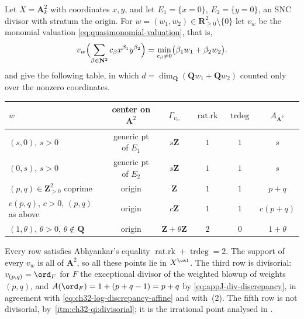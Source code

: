 \begin{example}
\label{ex:ch32-affine-plane}
Let $X=\mathbf A^2_k$ with coordinates $x,y$, and let
$E_1=\{x=0\}$, $E_2=\{y=0\}$, an SNC divisor with stratum the origin.
For $w=(w_1,w_2)\in\mathbf R^2_{\geq0}\setminus\{0\}$ let $v_w$ be the
monomial valuation \eqref{eq:quasimonomial-valuation}, that is,
\[
 v_w\Bigl(\sum_{\beta\in\mathbf N^2}c_\beta x^{\beta_1}y^{\beta_2}\Bigr)
 =\min_{c_\beta\neq0}\bigl(\beta_1w_1+\beta_2w_2\bigr).
\]
 and
 give the following table, in which
$d=\dim_{\mathbf Q}(\mathbf Qw_1+\mathbf Qw_2)$ counted only over the
nonzero coordinates.

\begin{center}
\small
\begin{tabular}{l|c|c|c|c|c}
\toprule
$w$&center on $\mathbf A^2$&$\Gamma_{v_w}$&
 $\operatorname{rat.rk}$&$\operatorname{trdeg}$&$A_{\mathbf A^2}$\\
\midrule
$(s,0)$, $s>0$&generic pt of $E_1$&$s\mathbf Z$&$1$&$1$&$s$\\
$(0,s)$, $s>0$&generic pt of $E_2$&$s\mathbf Z$&$1$&$1$&$s$\\
$(p,q)\in\mathbf Z_{>0}^2$ coprime&origin&$\mathbf Z$&$1$&$1$&$p+q$\\
$c(p,q)$, $c>0$, $(p,q)$ as above&origin&$c\mathbf Z$&$1$&$1$&$c(p+q)$\\
$(1,\theta)$, $\theta>0$, $\theta\notin\mathbf Q$&origin&
 $\mathbf Z+\theta\mathbf Z$&$2$&$0$&$1+\theta$\\
\bottomrule
\end{tabular}
\end{center}

Every row satisfies Abhyankar's equality
$\operatorname{rat.rk}+\operatorname{trdeg}=2$.  The support of every
$v_w$ is all of $\mathbf A^2$, so all these points lie in
$X^{\val}$.  The third row is divisorial: $v_{(p,q)}=\ord_F$ for $F$
the exceptional divisor of the weighted blowup of weights $(p,q)$, and
$A(\ord_F)=1+(p+q-1)=p+q$ by \eqref{eq:appJ-div-discrepancy}, in agreement
with \eqref{eq:ch32-log-discrepancy-affine} and with
\,(2).  The fifth row is not divisorial,
by
\,\cref{itm:ch32-qi:divisorial}; it is
the irrational point analysed in .


\end{example}
